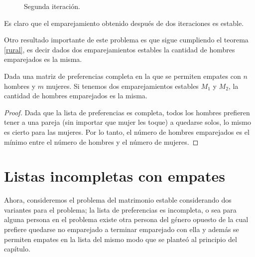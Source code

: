 \begin{eje}
\begin{figure}[H]

\caption{Segunda iteración.}
\end{figure}

Es claro que el emparejamiento obtenido después de dos iteraciones es estable.
\end{eje}

Otro resultado importante de este problema es que sigue cumpliendo el teorema \ref{rural}, es decir dados dos emparejamientos estables la cantidad de hombres emparejados es la misma.

\begin{cor}
Dada una matriz de preferencias completa en la que se permiten empates con $n$ hombres y $m$ mujeres. Si tenemos dos emparejamientos estables $M_1$ y $M_2$, la cantidad de hombres emparejados es la misma.
\end{cor}
\begin{proof}
Dada que la lista de preferencias es completa, todos los hombres prefieren tener a una pareja (sin importar que mujer les toque) a quedarse solos, lo mismo es cierto para las mujeres. Por lo tanto, el número de hombres emparejados es el mínimo entre el número de hombres y el número de mujeres. 
\end{proof}

\section{Listas incompletas con empates}
Ahora, consideremos el problema del matrimonio estable considerando dos variantes para el problema; la lista de preferencias es incompleta, o sea para alguna persona en el problema existe otra persona del género opuesto de la cual prefiere quedarse no emparejado a terminar emparejado con ella y además se permiten empates en la lista del mismo modo que se planteó al principio del capítulo. 

